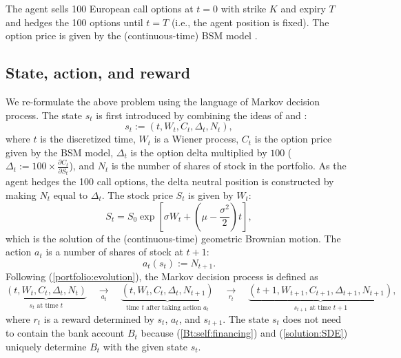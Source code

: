 \documentclass[11pt]{article}
\begin{document}
The agent sells 100 European call options at $t=0$ with strike $K$ and expiry $T$ and hedges the 100 options until $t=T$ (i.e., the agent position is fixed). The option price is given by the (continuous-time) BSM model \citep{Shreve:2008}.

\subsection{State, action, and reward}

We re-formulate the above problem using the language of Markov decision process. The state $s_t$ is first introduced by combining the ideas of \citep{Halperin:2017, Halperin:2018} and \citep{Kolm:Ritter:2019}:
%
\begin{equation}
	s_t := \left(t, W_t, C_t, \Delta_t, N_t \right),
\end{equation}
%
where $t$ is the discretized time, $W_t$ is a Wiener process, $C_t$ is the option price given by the BSM model, $\Delta_t$ is the option delta multiplied by $100$ ($\Delta_t := 100 \times \frac{\partial C_t}{\partial S_t}$), and $N_t$ is the number of shares of stock in the portfolio. As the agent hedges the 100 call options, the delta neutral position is constructed by making $N_t$ equal to $\Delta_t$. The stock price $S_t$ is given by $W_t$:
%
\begin{equation}
	S_t = S_0 \exp \left[ \sigma W_t + \left(\mu - \frac{\sigma^2}{2} \right) t \right], \label{solution:SDE}
\end{equation}
%
which is the solution of the (continuous-time) geometric Brownian motion. The action $a_t$ is a number of shares of stock at $t+1$:
%
\begin{equation}
	a_t(s_t) := N_{t+1}. 
\end{equation}
%
Following (\ref{portfolio:evolution}), the Markov decision process is defined as
%
\begin{equation}
	\underbrace{\left(t, W_t, C_t, \Delta_t, N_t \right)}_{s_t \text{ at time } t} \quad \underset{a_t }{\longrightarrow} \quad \underbrace{\left(t, W_t, C_t, \Delta_t, N_{t+1} \right)}_{\text{time } t \text{ after taking action } a_t} \quad \underset{r_t }{\longrightarrow} \quad \underbrace{\left(t + 1, W_{t+1}, C_{t+1}, \Delta_{t+1}, N_{t+1} \right)}_{s_{t+1} \text{ at time } t+1},
\end{equation} 
%
where $r_t$ is a reward determined by $s_t$, $a_t$, and $s_{t+1}$. The state $s_t$ does not need to contain the bank account $B_t$ because (\ref{Bt:self:financing}) and (\ref{solution:SDE}) uniquely determine $B_t$ with the given state $s_t$.  
\end{document}
